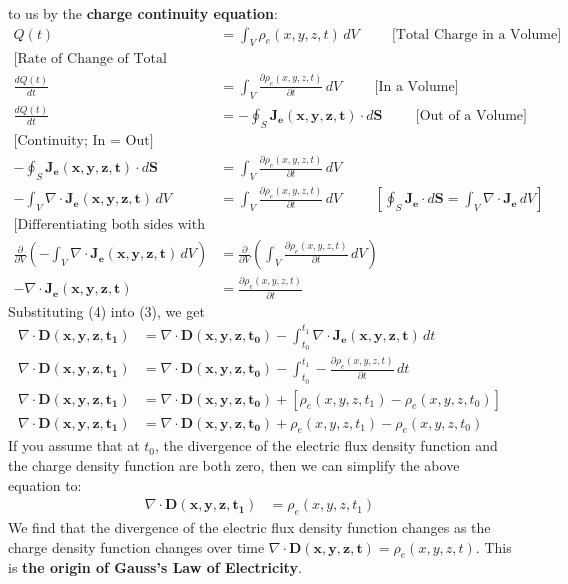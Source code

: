 to us by the \textbf{charge continuity equation}:
\begin{align*}
  Q(t) &= \int_V \rho_e(x,y,z,t) \, dV \hspace{1cm} \text{[Total Charge in a Volume]} \\
  \text{[Rate of Change of Total Charge]} \\
  \frac{dQ(t)}{dt} &= \int_V \frac{\partial \rho_e(x,y,z,t)}{\partial t} \, dV \hspace{1cm} \text{[In a Volume]} \\
  \frac{dQ(t)}{dt} &= - \oint_S \mathbf{J_e(x,y,z,t)} \cdot d\mathbf{S} \hspace{1cm} \text{[Out of a Volume]} \\
  \text{[Continuity; In = Out]} \\
  - \oint_S \mathbf{J_e(x,y,z,t)} \cdot d\mathbf{S} &= \int_V \frac{\partial \rho_e(x,y,z,t)}{\partial t} \, dV \\
  - \int_V \nabla \cdot \mathbf{J_e(x,y,z,t)} \, dV &= \int_V \frac{\partial \rho_e(x,y,z,t)}{\partial t} \, dV \hspace{1cm} \left[\oint_S \mathbf{J_e} \cdot d\mathbf{S} = \int_V \nabla \cdot \mathbf{J_e} \, dV\right] \\
  \text{[Differentiating both sides with respect to Volume]} \\
  \frac{\partial}{\partial V} \left(- \int_V \nabla \cdot \mathbf{J_e(x,y,z,t)} \, dV\right) &= \frac{\partial}{\partial V} \left(\int_V \frac{\partial \rho_e(x,y,z,t)}{\partial t} \, dV\right) \\
  - \nabla \cdot \mathbf{J_e(x,y,z,t)} &= \frac{\partial \rho_e(x,y,z,t)}{\partial t} \tag{4}
\end{align*}
Substituting (4) into (3), we get
\begin{align*}
  \nabla \cdot \mathbf{D(x,y,z,t_1)} &= \nabla \cdot \mathbf{D(x,y,z,t_0)} - \int_{t_0}^{t_1} \nabla \cdot \mathbf{J_e(x,y,z,t)} \, dt \\
  \nabla \cdot \mathbf{D(x,y,z,t_1)} &= \nabla \cdot \mathbf{D(x,y,z,t_0)} - \int_{t_0}^{t_1} - \frac{\partial \rho_e(x,y,z,t)}{\partial t} \, dt \\
  \nabla \cdot \mathbf{D(x,y,z,t_1)} &= \nabla \cdot \mathbf{D(x,y,z,t_0)} + [\rho_e(x,y,z,t_1) - \rho_e(x,y,z,t_0)] \\
  \nabla \cdot \mathbf{D(x,y,z,t_1)} &= \nabla \cdot \mathbf{D(x,y,z,t_0)} + \rho_e(x,y,z,t_1) - \rho_e(x,y,z,t_0)
\end{align*}
If you assume that at \(t_0\), the divergence of the electric flux density
function and the charge density function are both zero, then we can simplify
the above equation to:
\begin{align*}
  \nabla \cdot \mathbf{D(x,y,z,t_1)} &= \rho_e(x,y,z,t_1)
\end{align*}
We find that the divergence of the electric flux density function changes as
the charge density function changes over time \( \nabla \cdot \mathbf{D(x,y,z,t)} =
\rho_e(x,y,z,t) \). This is \textbf{the origin of Gauss's Law of Electricity}.

